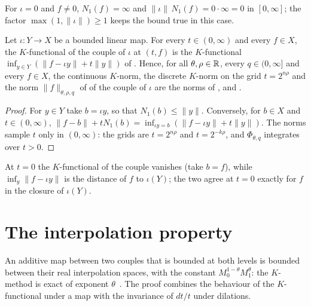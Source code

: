 For $\iota = 0$ and $f \neq 0$, $N_1(f) = \infty$ and $\|\iota\| \, N_1(f) = 0 \cdot \infty = 0$
in $[0, \infty]$; the factor $\max(1, \|\iota\|) \geq 1$ keeps the bound true in this case.

\begin{proposition}
\label{prop:map-couple-k-method}
\leanok
{}
Let $\iota : Y \to X$ be a bounded linear map. For every $t \in (0, \infty)$ and every
$f \in X$, the $K$-functional of the couple of $\iota$ at $(t, f)$ is the $K$-functional
$\inf_{y \in Y} (\|f - \iota y\| + t \|y\|)$ of . Hence, for all
$\theta, \rho \in \mathbb{R}$, every $q \in (0, \infty]$ and every $f \in X$, the continuous
$K$-norm, the discrete $K$-norm on the grid $t = 2^{n\rho}$ and the norm
$\|f\|_{\theta, \rho, q}$ of  of the couple of $\iota$ are the
norms of ,  and
.
\end{proposition}

\begin{proof}
\leanok
For $y \in Y$ take $b = \iota y$, so that $N_1(b) \leq \|y\|$. Conversely, for $b \in X$ and
$t \in (0, \infty)$,
$\|f - b\| + t N_1(b) = \inf_{\iota y = b} (\|f - \iota y\| + t \|y\|)$. The norms sample $t$
only in $(0, \infty)$: the grids are $t = 2^{n\rho}$ and $t = 2^{-k\rho}$, and $\Phi_{\theta, q}$
integrates over $t > 0$.
\end{proof}

At $t = 0$ the $K$-functional of the couple vanishes (take $b = f$), while
$\inf_y \|f - \iota y\|$ is the distance of $f$ to $\iota(Y)$; the two agree at $t = 0$ exactly
for $f$ in the closure of $\iota(Y)$.

\section{The interpolation property}
\label{sec:interpolation-property}

An additive map between two couples that is bounded at both levels is bounded between their
real interpolation spaces, with the constant $M_0^{1-\theta} M_1^{\theta}$: the $K$-method is
exact of exponent $\theta$~\cite[Theorems~3.1.2 and~3.11.2]{BerghLofstrom}. The proof combines
the behaviour of the $K$-functional under a map with the invariance of $dt/t$ under dilations.

